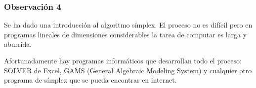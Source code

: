 \documentclass{beamer}
\begin{document}
\begin{frame}
\frametitle{Observaci\'on 4}
Se ha dado una introducci\'on al algoritmo s\'implex. El proceso no es dif\'icil pero en programas lineales de dimensiones considerables la tarea de computar es larga y aburrida.

Afortunadamente hay programas inform\'aticos que desarrollan todo el proceso: SOLVER de Excel, GAMS (General Algebraic Modeling System) y cualquier otro programa de s\'implex que se pueda encontrar en internet.
\end{frame}


\end{document}
